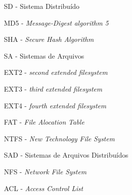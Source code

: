 \item SD - Sistema Distribuído
\item MD5 - \textit{Message-Digest algorithm 5}
\item SHA - \textit{Secure Hash Algorithm}
\item SA - Sistemas de Arquivos
\item EXT2 - \textit{second extended filesystem}
\item EXT3 - \textit{third extended filesystem}
\item EXT4 - \textit{fourth extended filesystem}
\item FAT - \textit{File Alocation Table}
\item NTFS - \textit{New Technology File System}
\item SAD - Sistemas de Arquivos Distribuídos
\item NFS - \textit{Network File System} 
\item ACL - \textit{Access Control List}

